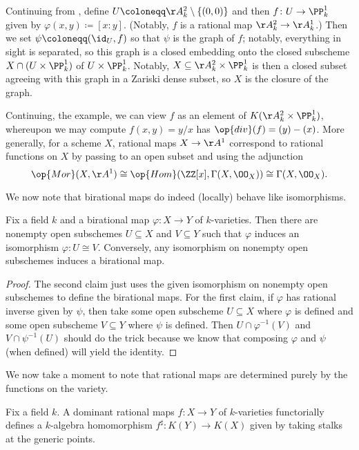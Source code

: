 \documentclass[../notes.tex]{subfiles}
\begin{document}
\begin{example}
	Continuing from , define $U\coloneqq\AA^2_k\setminus\{(0,0)\}$ and then $f\colon U\to\PP^1_k$ given by $\varphi(x,y)\coloneqq[x:y]$. (Notably, $f$ is a rational map $\AA^2_k\to\AA^1_k$.) Then we set $\psi\coloneqq({\id_U},f)$ so that $\psi$ is the graph of $f$; notably, everything in sight is separated, so this graph is a closed embedding onto the closed subscheme $X\cap(U\times\PP^1_k)$ of $U\times\PP^1_k$. Notably, $X\subseteq\AA^2_k\times\PP^1_k$ is then a closed subset agreeing with this graph in a Zariski dense subset, so $X$ is the closure of the graph.
\end{example}
\begin{remark}
	Continuing, the example, we can view $f$ as an element of $K(\AA^2_k\times\PP^1_k)$, whereupon we may compute $f(x,y)=y/x$ has $\op{div}(f)=(y)-(x)$. More generally, for a scheme $X$, rational maps $X\to\AA^1$ correspond to rational functions on $X$ by passing to an open subset and using the adjunction
	\[\op{Mor}(X,\AA^1)\cong\op{Hom}(\ZZ[x],\Gamma(X,\OO_X))\cong\Gamma(X,\OO_X).\]
\end{remark}
We now note that birational maps do indeed (locally) behave like isomorphisms.
\begin{proposition}
	Fix a field $k$ and a birational map $\varphi\colon X\to Y$ of $k$-varieties. Then there are nonempty open subschemes $U\subseteq X$ and $V\subseteq Y$ such that $\varphi$ induces an isomorphism $\varphi\colon U\cong V$. Conversely, any isomorphism on nonempty open subschemes induces a birational map.
\end{proposition}
\begin{proof}
	The second claim just uses the given isomorphism on nonempty open subschemes to define the birational maps. For the first claim, if $\varphi$ has rational inverse given by $\psi$, then take some open subscheme $U\subseteq X$ where $\varphi$ is defined and some open subscheme $V\subseteq Y$ where $\psi$ is defined. Then $U\cap\varphi^{-1}(V)$ and $V\cap\psi^{-1}(U)$ should do the trick because we know that composing $\varphi$ and $\psi$ (when defined) will yield the identity.
\end{proof}
We now take a moment to note that rational maps are determined purely by the functions on the variety.
\begin{proposition}
	Fix a field $k$. A dominant rational maps $f\colon X\to Y$ of $k$-varieties functorially defines a $k$-algebra homomorphism $f^\sharp\colon K(Y)\to K(X)$ given by taking stalks at the generic points.
\end{proposition}
\end{document}
